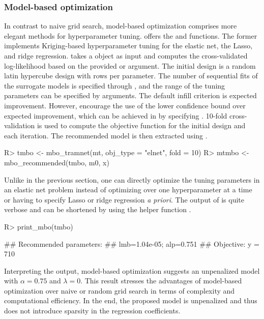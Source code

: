 \subsubsection{Model-based optimization} \label{subsec:prostatembo}

In contrast to naive grid search, model-based optimization comprises more
elegant methods for hyperparameter tuning.  offers the 
and  functions. The former implements Kriging-based hyperparameter
tuning for the elastic net, the Lasso, and ridge regression. 
takes a  object as input and computes the cross-validated log-likelihood
based on the provided  or  argument. The initial design
is a random latin hypercube design with  rows per parameter.
The number of sequential fits of the surrogate models is specified through
, and the range of the tuning parameters can be specified by
 arguments. The default infill criterion is expected improvement.
However, \citet{mlrMBO} encourage the use of the lower confidence bound over
expected improvement, which can be achieved in  by specifying
. 10-fold cross-validation is used to compute
the objective function for the initial design and each iteration. The recommended
model is then extracted using .
\begin{example}
R> tmbo <- mbo_tramnet(mt, obj_type = "elnet", fold = 10)
R> mtmbo <- mbo_recommended(tmbo, m0, x)
\end{example}

Unlike in the previous section, one can directly optimize the tuning parameters
in an elastic net problem instead of optimizing over one hyperparameter at a time
or having to specify Lasso or ridge regression \emph{a priori}. The output of
 is quite verbose and can be shortened by using the helper
function .
\begin{example}
R> print_mbo(tmbo)

## Recommended parameters:
## lmb=1.04e-05; alp=0.751 
## Objective: y = 710 
\end{example}
Interpreting the output, model-based optimization suggests an unpenalized model
with $\alpha = 0.75$ and $\lambda = 0$.
This result stresses the advantages of model-based optimization over naive or random
grid search in terms of complexity and computational efficiency. In the end, the
proposed model is unpenalized and thus does not introduce sparsity in the regression
coefficients.

